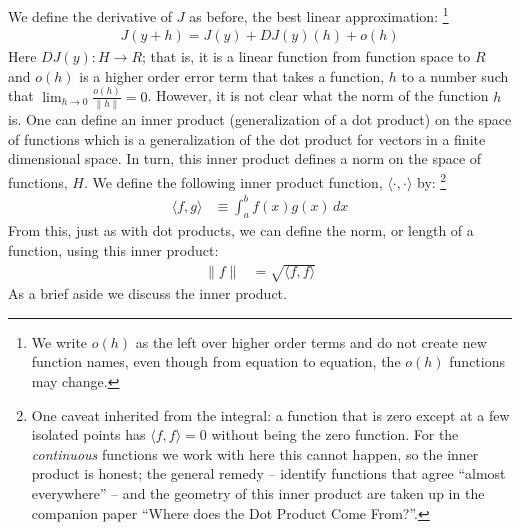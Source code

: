 \documentclass{article}
\begin{document}
We define the derivative of $J$ as before, the best linear approximation:%
\footnote{We write $o(h)$ as the left over higher order terms and do not create new
function names, even though from equation to equation, the $o(h)$ functions may change.}
\begin{align}
  J(y + h) = J(y) + DJ(y)(h) + o(h)
\end{align}
Here $DJ(y): H \rightarrow R$; that is, it is a linear function from
function space to $R$ and $o(h)$ is a
higher order error term that takes a function, $h$ to a number such that
$\lim_{h \rightarrow 0}\frac{o(h)}{\|h\|} = 0$. However, it is not clear what the
norm of the function $h$ is. One can define an
inner product (generalization of a dot product) on the space of
functions which is a generalization of the dot product for vectors in
a finite dimensional space. In turn, this inner product defines a norm on the space
of functions, $H$.
We define the following inner product function,
$\langle \cdot, \cdot \rangle$ by:%
\footnote{One caveat inherited from the integral: a function that is zero
except at a few isolated points has $\langle f, f \rangle = 0$ without
being the zero function. For the {\em continuous\/} functions we work with
here this cannot happen, so the inner product is honest; the general
remedy -- identify functions that agree ``almost everywhere''{} -- and the
geometry of this inner product are taken up in the companion paper
``Where does the Dot Product Come From?''.}
\begin{align}
  \langle f, g \rangle &\equiv \int_a^b f(x) g(x)\, dx \label{inner_prod}
\end{align}
From this, just as with dot products, we can define the norm, or length of a function,
using this inner product:
\begin{align}
  \|f\| &= \sqrt{\langle f,f \rangle}
\end{align}
As a brief aside we discuss the inner product.
\end{document}
